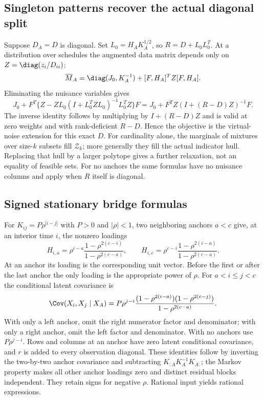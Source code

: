 \subsection{Singleton patterns recover the actual diagonal split}
Suppose $D_A=D$ is diagonal. Set $L_0=H_AK_A^{1/2}$, so
$R=D+L_0L_0^T$. At a distribution over schedules the augmented data
matrix depends only on $Z=\diag(z_i/D_{ii})$:
\[
 \overline M_A=\diag(J_0,K_A^{-1})+[F,H_A]^TZ[F,H_A].
\]
Eliminating the nuisance variables gives
\[
 J_0+F^T\{Z-ZL_0(I+L_0^TZL_0)^{-1}L_0^TZ\}F
 =J_0+F^TZ(I+(R-D)Z)^{-1}F.
\]
The inverse identity follows by multiplying by $I+(R-D)Z$ and is valid
at zero weights and with rank-deficient $R-D$. Hence the objective is the
virtual-noise extension for this exact $D$. For cardinality alone, the
marginals of mixtures over size-$k$ subsets fill $\mathcal Z_k$; more generally
they fill the actual indicator hull. Replacing that hull by a larger
polytope gives a further relaxation, not an equality of feasible sets.
For no anchors the same formulas have no nuisance columns and apply when
$R$ itself is diagonal.

\subsection{Signed stationary bridge formulas}
\label{app:stationary-bridges}
For $K_{ij}=P\rho^{|i-j|}$ with $P>0$ and $|\rho|<1$, two neighboring
anchors $a<c$ give, at an interior time $i$, the nonzero loadings
\begin{equation}\label{eq:bridge-loadings}
 H_{i,a}=\rho^{i-a}\frac{1-\rho^{2(c-i)}}{1-\rho^{2(c-a)}},\qquad
 H_{i,c}=\rho^{c-i}\frac{1-\rho^{2(i-a)}}{1-\rho^{2(c-a)}}.
\end{equation}
At an anchor its loading is the corresponding unit vector. Before the first
or after the last anchor the only loading is the appropriate power of
$\rho$. For $a<i\le j<c$ the conditional latent covariance is
\begin{equation}\label{eq:bridge-covariance}
 \Cov(X_i,X_j\mid X_A)
 =P\rho^{j-i}
 \frac{(1-\rho^{2(i-a)})(1-\rho^{2(c-j)})}{1-\rho^{2(c-a)}}.
\end{equation}
With only a left anchor, omit the right numerator factor and denominator;
with only a right anchor, omit the left factor and denominator. With no
anchors use $P\rho^{j-i}$. Rows and columns at an anchor have zero latent
conditional covariance, and $r$ is added to every observation diagonal.
These identities follow by inverting the two-by-two anchor covariance and
subtracting $K_{:A}K_A^{-1}K_{A:}$; the Markov property makes all other anchor
loadings zero and distinct residual blocks independent. They retain signs
for negative $\rho$. Rational input yields rational expressions.

